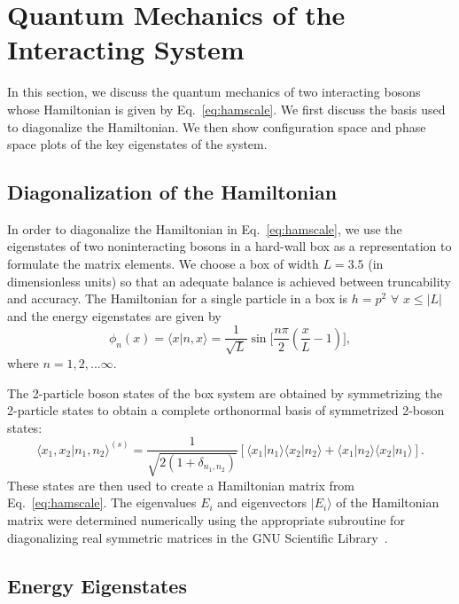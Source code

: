 \section{\label{sec:4} Quantum Mechanics of the Interacting System}
\label{chapter-dblwell:section:qmech}
%
%
In this section, we discuss the quantum mechanics of two interacting bosons whose Hamiltonian is given by Eq.~\eqref{eq:hamscale}.  We first discuss the basis used to diagonalize the Hamiltonian. We then show configuration space and phase space plots of the key eigenstates of the system. 
%
\subsection{Diagonalization of the Hamiltonian}
\label{chapter-dblwell:diaghamilt}
%
In order to diagonalize the Hamiltonian in Eq.~\eqref{eq:hamscale}, we use the eigenstates of two noninteracting bosons in a hard-wall box as a representation to formulate the matrix elements.  We choose a box of width  $L=3.5$ (in dimensionless units)   so that an adequate balance is achieved between truncability and accuracy. The Hamiltonian  for a single particle in a box is $h=p^2$  $\forall$ $x\leq|L|$ and the energy eigenstates are given by 
%
\begin{equation}
\phi_n(x)=\langle x|n,x\rangle=\frac{1}{\sqrt{L}} \sin{\biggl[}{\frac{n\pi}{2}(\frac{x}{L}-1){\biggr]}},
\label{eq:pboxfn}
\end{equation}
%
where $n=1,2,...\infty$. 

The 2-particle boson states of the box system are obtained by symmetrizing the 2-particle states to obtain a complete orthonormal basis of symmetrized 2-boson states:
%
\begin{equation}
{\langle}x_1,x_2\vert n_1,n_2{\rangle} ^{(s)}=\frac{1}{\sqrt{2(1+\delta_{n_1,n_2})}} 
[{\langle}x_1|n_1\rangle{\langle}x_2|n_2\rangle +{\langle}x_1|n_2\rangle{\langle}x_2|n_1\rangle ].
\label{eq:symm}
\end{equation}
These states are then used to create a Hamiltonian matrix from Eq.~\eqref{eq:hamscale}. The eigenvalues $E_i$ and eigenvectors $\vert E_i \rangle$ of the Hamiltonian matrix were determined numerically using the appropriate subroutine for diagonalizing real symmetric matrices in the GNU Scientific Library~\cite{galassi:gsl}.  
%
%
\subsection{Energy Eigenstates}
%
%

